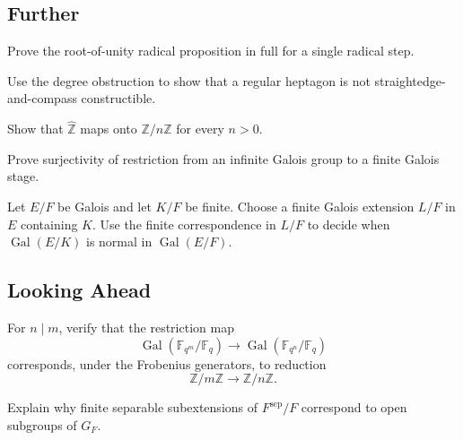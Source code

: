 \subsection*{Further}
\begin{exercise}[Further] Prove the root-of-unity radical proposition in full
for a single radical step.
\end{exercise}
\begin{exercise}[Further] Use the degree obstruction to show that a regular
heptagon is not straightedge-and-compass constructible.
\end{exercise}
\begin{exercise}[Further] Show that \(\widehat{\mathbb Z}\) maps onto
\(\mathbb Z/n\mathbb Z\) for every \(n>0\).
\end{exercise}
\begin{exercise}[Further] Prove surjectivity of restriction from an infinite
Galois group to a finite Galois stage.
\end{exercise}
\begin{exercise}[Further] Let \(E/F\) be Galois and let \(K/F\) be finite.
Choose a finite Galois extension \(L/F\) in \(E\) containing \(K\).  Use the
finite correspondence in \(L/F\) to decide when
\(\operatorname{Gal}(E/K)\) is normal in \(\operatorname{Gal}(E/F)\).
\end{exercise}

\subsection*{Looking Ahead}
\begin{exercise} For \(n\mid m\), verify that the restriction
map
\[
\operatorname{Gal}(\mathbb F_{q^m}/\mathbb F_q)
\longrightarrow
\operatorname{Gal}(\mathbb F_{q^n}/\mathbb F_q)
\]
corresponds, under the Frobenius generators, to reduction
\[
\mathbb Z/m\mathbb Z\longrightarrow\mathbb Z/n\mathbb Z.
\]
\end{exercise}
\begin{exercise} Explain why finite separable subextensions of
\(F^{\mathrm{sep}}/F\) correspond to open subgroups of \(G_F\).
\end{exercise}
